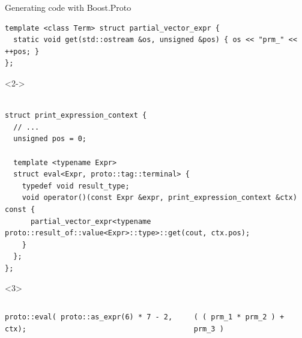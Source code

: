 \documentclass[@BEAMER_OPTIONS@]{beamer}
\begin{document}
\begin{frame}[fragile]{Generating code with Boost.Proto}
    \begin{exampleblock}{}
        \begin{lstlisting}
template <class Term> struct partial_vector_expr {
  static void get(std::ostream &os, unsigned &pos) { os << "prm_" << ++pos; }
};
        \end{lstlisting}
        \begin{uncoverenv}<2->
            \begin{lstlisting}[firstnumber=last]

struct print_expression_context {
  // ...
  unsigned pos = 0;

  template <typename Expr>
  struct eval<Expr, proto::tag::terminal> {
    typedef void result_type;
    void operator()(const Expr &expr, print_expression_context &ctx) const {
      partial_vector_expr<typename proto::result_of::value<Expr>::type>::get(cout, ctx.pos);
    }
  };
};
            \end{lstlisting}
        \end{uncoverenv}
    \end{exampleblock}
    \begin{uncoverenv}<3>
        \begin{columns}
            \begin{column}{0.53\textwidth}
                \begin{exampleblock}{}
                    \begin{lstlisting}
proto::eval( proto::as_expr(6) * 7 - 2, ctx);
                    \end{lstlisting}
                \end{exampleblock}
            \end{column}
            \begin{column}{0.4\textwidth}
                \begin{exampleblock}{}
                    \begin{verbatim}
( ( prm_1 * prm_2 ) + prm_3 )
                    \end{verbatim}
                \end{exampleblock}
            \end{column}
        \end{columns}
    \end{uncoverenv}
\end{frame}
\end{document}
